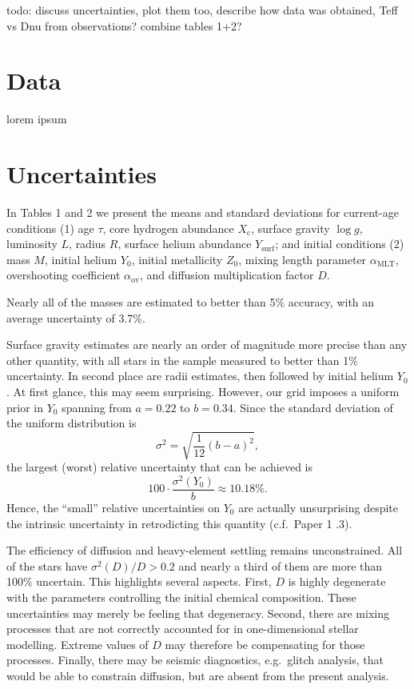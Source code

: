 \documentclass[epjCONF,columns]{svjour} %
\begin{document}
todo: discuss uncertainties, plot them too, describe how data was obtained, Teff vs Dnu from observations? combine tables 1+2? 


\section{Data}
\label{data}

lorem ipsum


\section{Uncertainties} 
\label{uncertainties} 

In Tables 1 and 2 we present the means and standard deviations for current-age conditions (1) age $\tau$, core hydrogen abundance $X_{\mathrm{c}}$, surface gravity $\log g$, luminosity $L$, radius $R$, surface helium abundance $Y_{\mathrm{surf}}$; and initial conditions (2) mass $M$, initial helium $Y_0$, initial metallicity $Z_0$, mixing length parameter $\alpha_{\mathrm{MLT}}$, overshooting coefficient $\alpha_{\mathrm{ov}}$, and diffusion multiplication factor $D$. 

Nearly all of the masses are estimated to better than 5\% accuracy, with an average uncertainty of 3.7\%. 

Surface gravity estimates are nearly an order of magnitude more precise than any other quantity, with all stars in the sample measured to better than 1\% uncertainty. In second place are radii estimates, then followed by initial helium $Y_0$. At first glance, this may seem surprising. However, our grid imposes a uniform prior in $Y_0$ spanning from $a=0.22$ to $b=0.34$. Since the standard deviation of the uniform distribution is 
$$\sigma^2 = \sqrt{ \frac{1}{12} ( b-a )^2 },$$ 
the largest (worst) relative uncertainty that can be achieved is 
$$100 \cdot \frac{\sigma^2(Y_0)}{b} \approx 10.18\%.$$ 
Hence, the ``small'' relative uncertainties on $Y_0$ are actually unsurprising despite the intrinsic uncertainty in retrodicting this quantity (c.f.~Paper 1 .3). 

The efficiency of diffusion and heavy-element settling remains unconstrained. All of the stars have $\sigma^2(D)/D > 0.2$ and nearly a third of them are more than 100\% uncertain. This highlights several aspects. First, $D$ is highly degenerate with the parameters controlling the initial chemical composition. These uncertainties may merely be feeling that degeneracy. Second, there are mixing processes that are not correctly accounted for in one-dimensional stellar modelling. Extreme values of $D$ may therefore be compensating for those processes. Finally, there may be seismic diagnostics, e.g.~glitch analysis, that would be able to constrain diffusion, but are absent from the present analysis. 
\end{document}
